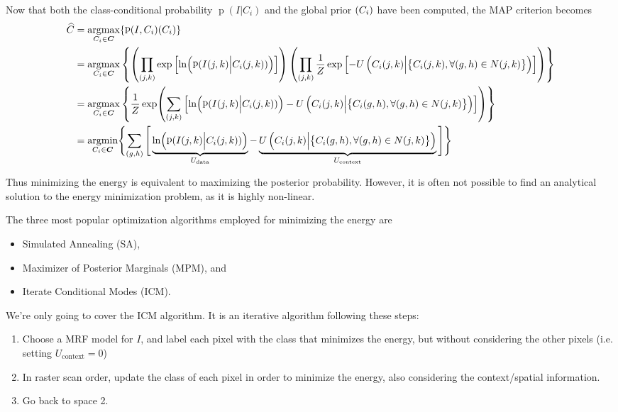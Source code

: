 \documentclass[oneside,onecolumn]{report}
\DeclareMathOperator*{\argmax}{argmax}
\DeclareMathOperator*{\argmin}{argmin}
\DeclareMathOperator*{\pdf}{p}
\let\P\relax
\DeclareMathOperator*{\P}{P}
\begin{document}
Now that both the class-conditional probability $\pdf(I | C_i)$ and the global prior $\P(C_i)$ have been computed, the MAP criterion becomes
\begin{align*}
    \widehat C
    &= \argmax_{C_i \in \bm C}\{ \pdf(I, C_i) \P(C_i) \} \\
    &= \argmax_{C_i \in \bm C}
    \left\{
        \left( \prod_{(j, k)} \exp\left[\ln(\pdf(I(j, k) \Big| C_i(j, k)))\right] \right)
        \left( \prod_{(j, k)} \frac{1}{Z} \exp\left[-U \left( C_i(j, k) \Big| \big\{ C_i(j, k), \forall (g, h) \in N(j, k) \big\} \right)\right] \right)
    \right\} \\
    &= \argmax_{C_i \in \bm C}
    \left\{
    \frac{1}{Z}
    \exp(
        \sum_{(j, k)} \left[
            \ln(\pdf(I(j, k) \Big| C_i(j, k)))
            -U \left( C_i(j, k) \Big| \big\{ C_i(g, h), \forall (g, h) \in N(j, k) \big\} \right)
        \right]
    )
    \right\} \\
    &= \argmin_{C_i \in \bm C}
    \Biggl\{
        \sum_{(g, h)} \Bigg[
            \underbrace{\ln(\pdf(I(j, k) \Big| C_i(j, k)))}_{U_\text{data}}
            -
            \underbrace{U \left( C_i(j, k) \Big| \big\{ C_i(g, h), \forall (g, h) \in N(j, k) \big\} \right)}_{U_\text{context}}
        \Bigg]
    \Biggr\}
\end{align*}

Thus minimizing the energy is equivalent to maximizing the posterior probability.
However, it is often not possible to find an analytical solution to the energy minimization problem, as it is highly non-linear.

The three most popular optimization algorithms employed for minimizing the energy are
\begin{itemize}
    \item Simulated Annealing (SA),
    \item Maximizer of Posterior Marginals (MPM), and
    \item Iterate Conditional Modes (ICM).
\end{itemize}

We're only going to cover the ICM algorithm.
It is an iterative algorithm following these steps:
\begin{enumerate}
    \item Choose a MRF model for $I$, and label each pixel with the class that minimizes the energy, but without considering the other pixels (i.e. setting $U_\text{context} = 0$)
    \item In raster scan order, update the class of each pixel in order to minimize the energy, also considering the context/spatial information.
    \item Go back to space 2.
\end{enumerate}
\end{document}
